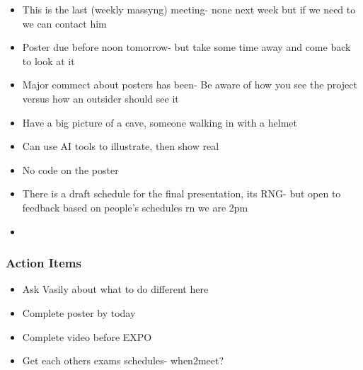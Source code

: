 \begin{itemize}
				\item This is the last (weekly massyng) meeting- none next week but if we need to we can contact him
				\item Poster due before noon tomorrow- but take some time away and come back to look at it 
				\item Major commect about posters has been- Be aware of how you see the project versus how an outsider should see it 
				\item Have a big picture of a cave, someone walking in with a helmet 
				\item Can use AI tools to illustrate, then show real 
				\item No code on the poster 
				\item There is a draft schedule for the final presentation, its RNG- but open to feedback based on people's schedules rn we are 2pm
				\item 
			\end{itemize}

		\subsubsection*{Action Items}
			\begin{itemize}
				\item Ask Vasily about what to do different here
				\item Complete poster by today
				\item Complete video before EXPO
				\item Get each others exams schedules- when2meet?
			\end{itemize}

